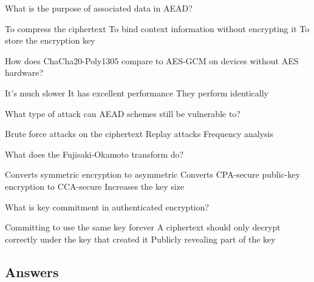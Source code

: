 \documentclass[10pt,a4paper,american]{exam}
\begin{document}
\begin{questions}
	\question What is the purpose of associated data in AEAD?
	\begin{randomizechoices}
		\choice To compress the ciphertext
		\CorrectChoice To bind context information without encrypting it
		\choice To store the encryption key
	\end{randomizechoices}

	\question How does ChaCha20-Poly1305 compare to AES-GCM on devices without AES hardware?
	\begin{randomizechoices}
		\choice It's much slower
		\CorrectChoice It has excellent performance
		\choice They perform identically
	\end{randomizechoices}

	\question What type of attack can AEAD schemes still be vulnerable to?
	\begin{randomizechoices}
		\choice Brute force attacks on the ciphertext
		\CorrectChoice Replay attacks
		\choice Frequency analysis
	\end{randomizechoices}

	\question What does the Fujisaki-Okamoto transform do?
	\begin{randomizechoices}
		\choice Converts symmetric encryption to asymmetric
		\CorrectChoice Converts CPA-secure public-key encryption to CCA-secure
		\choice Increases the key size
	\end{randomizechoices}

	\question What is key commitment in authenticated encryption?
	\begin{randomizechoices}
		\choice Committing to use the same key forever
		\CorrectChoice A ciphertext should only decrypt correctly under the key that created it
		\choice Publicly revealing part of the key
	\end{randomizechoices}

\end{questions}

\clearpage

\subsection*{Answers}
\printkeytable
\end{document}
